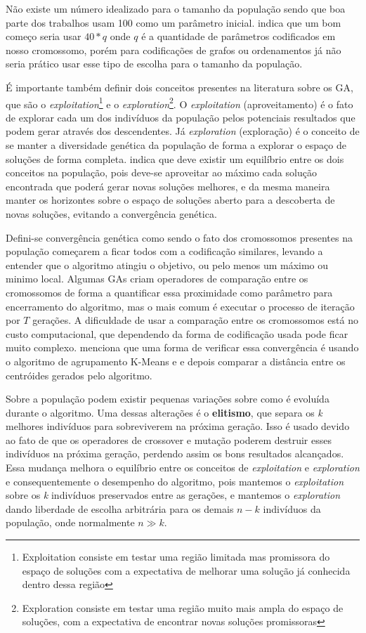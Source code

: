 Não existe um número idealizado para o tamanho da população sendo que boa parte dos trabalhos usam 100 como um parâmetro inicial. \citeauthor{Linden2008} indica que um bom começo seria usar \(40 * q\) onde \(q\) é a quantidade de parâmetros codificados em nosso cromossomo, porém para codificações de grafos ou ordenamentos já não seria prático usar esse tipo de escolha para o tamanho da população.

É importante também definir dois conceitos presentes na literatura sobre os GA, que são o \textit{exploitation}\footnote{Exploitation consiste em testar uma região limitada mas promissora do espaço de soluções com a expectativa de melhorar uma solução já conhecida dentro dessa região} e o \textit{exploration}\footnote{Exploration consiste em testar uma região muito mais ampla do espaço de soluções, com a expectativa de encontrar novas soluções promissoras}. O \textit{exploitation} (aproveitamento) é o fato de explorar cada um dos indivíduos da população pelos potenciais resultados que podem gerar através dos descendentes. Já \textit{exploration} (exploração) é o conceito de se manter a diversidade genética da população de forma a explorar o espaço de soluções de forma completa. \citeauthor{Holland1992} indica que deve existir um equilíbrio entre os dois conceitos na população, pois deve-se aproveitar ao máximo cada solução encontrada que poderá gerar novas soluções melhores, e da mesma maneira manter os horizontes sobre o espaço de soluções aberto para a descoberta de novas soluções, evitando a convergência genética.

Defini-se convergência genética como sendo o fato dos cromossomos presentes na população começarem a ficar todos com a codificação similares, levando a entender que o algoritmo atingiu o objetivo, ou pelo menos um máximo ou minimo local. Algumas GAs criam operadores de comparação entre os cromossomos de forma a quantificar essa proximidade como parâmetro para encerramento do algoritmo, mas o mais comum é executar o processo de iteração por \(T\) gerações. A dificuldade de usar a comparação entre os cromossomos está no custo computacional, que dependendo da forma de codificação usada pode ficar muito complexo. \citeauthor{Linden2008} menciona que uma forma de verificar essa convergência é usando o algoritmo de agrupamento K-Means e e depois comparar a distância entre os centróides gerados pelo algoritmo.

Sobre a população podem existir pequenas variações sobre como é evoluída durante o algoritmo. Uma dessas alterações é o \textbf{elitismo}, que separa os \textit{k} melhores indivíduos para sobreviverem na próxima geração. Isso é usado devido ao fato de que os operadores de crossover e mutação poderem destruir esses indivíduos na próxima geração, perdendo assim os bons resultados alcançados. Essa mudança melhora o equilíbrio entre os conceitos de \textit{exploitation} e \textit{exploration} e consequentemente o desempenho do algoritmo, pois mantemos o \textit{exploitation} sobre os \textit{k} indivíduos preservados entre as gerações, e mantemos o \textit{exploration} dando liberdade de escolha arbitrária para os demais \(n-k\) indivíduos da população, onde normalmente \(n \gg k\). 


